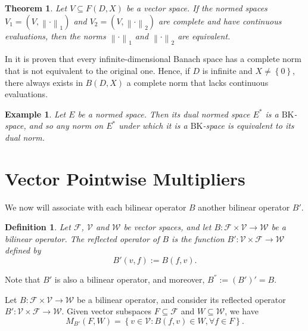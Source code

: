 \documentclass[14pt, a4paper]{article}  %
\providecommand{\llave}[1]{\left\lbrace #1\right\rbrace }
\providecommand{\pare}[1]{\left( #1\right) }
\providecommand{\norm}[1]{\left\lVert#1\right\rVert}
\newcommand{\tien}{\rightarrow}
\newcommand{\BK}{\text{BK}}
\newcommand{\F}{\mathcal{F}}
\newcommand{\V}{\mathcal{V}}
\newcommand{\W}{\mathcal{W}}
\newtheorem{theorem}{Theorem}[section]
\newtheorem{example}{Example}[section]  %
\newtheorem{definition}{Definition}[section]
\begin{document}



\begin{theorem}\label{piz22_1_0} 
	Let $V \subseteq F\pare{D, X}$ be a vector space. If the normed spaces  $V_{1} = (V, \norm{\cdot}_{1})$ and $V_{2} = (V, \norm{\cdot}_{2})$ are complete and have continuous evaluations, then the norms $\norm{\cdot}_{1}$ and $\norm{\cdot}_{2}$ are equivalent. 
\end{theorem}


 
In \cite[p. 414]{AN} it is proven that every infinite-dimensional Banach space has a complete norm that is not equivalent to the original one. Hence, if $D$ is infinite and $X\neq\llave{0}$, there always exists in $B\pare{D, X}$ a complete norm that lacks continuous evaluations.
 

\begin{example} 	
	Let $E$ be a normed space. Then its dual normed space $E^{*}$ is a $\BK$-space, and so any norm on $E^{*}$ under which it is a $\BK$-space is equivalent to its dual norm.
\end{example}



\section{Vector Pointwise Multipliers}\label{pop6}


We now will associate with each bilinear operator $B$  another  bilinear operator  $B'$.


\begin{definition} 	Let $\F$, $\V$ and $\W$ be vector spaces, and let $B:\F\times \V\tien \W$ be a bilinear operator. The  \emph{reflected operator of $B$} is the function    $B':\V\times \F\tien \W$ defined by
	\begin{equation}
		B'\pare{v,f}:=B\pare{f,v}.
	\end{equation}  
\end{definition}
Note that $B'$ is also a bilinear operator, and moreover, $B^{''}:=\pare{B'}'=B$.


Let  $B:\F\times \V\tien \W$ be a bilinear operator, and consider its reflected operator $B':\V\times \F\tien \W$. Given vector subspaces $F\subseteq \F$ and  $W\subseteq \W$, we have
\begin{equation}
	M_{B'}\pare{F,W}=\llave{v\in \V:B\pare{f,v}\in W,\forall f\in F}.
\end{equation}
\end{document}
